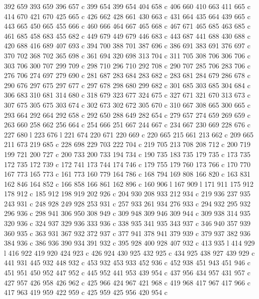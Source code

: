 {{   392 659 393 659 396 657 c
   399 654 399 654 404 658 c
   406 660 410 663 411 665 c
   414 670 421 670 425 665 c
   426 662 428 661 430 663 c
   431 664 435 664 439 665 c
   443 665 450 665 455 666 c
   460 666 464 667 465 668 c
   467 671 465 685 463 685 c
   461 685 458 683 455 682 c
   449 679 449 679 446 683 c
   443 687 441 688 430 688 c
   420 688 416 689 407 693 c
   394 700 388 701 387 696 c
   386 691 383 691 376 697 c
   370 702 368 702 365 698 c
   361 694 320 698 313 704 c
   311 705 308 706 306 706 c
   303 706 300 707 299 709 c
   298 710 296 710 292 708 c
   290 707 285 706 283 706 c
   276 706 274 697 279 690 c
   281 687 283 684 283 682 c
   283 681 284 679 286 678 c
   290 676 297 675 297 677 c
   297 678 298 680 299 682 c
   301 685 303 685 304 684 c
   306 683 310 681 314 680 c
   318 679 323 677 324 675 c
   327 671 321 670 313 673 c
   307 675 305 675 303 674 c
   302 673 302 672 305 670 c
   310 667 308 665 300 665 c
   293 664 292 664 292 658 c
   292 650 288 649 282 654 c
   279 657 274 659 269 659 c
   263 660 258 662 256 664 c
   254 666 251 667 244 667 c
   234 667 230 669 228 676 c
   227 680 l
   223 676 l
   221 674 220 671 220 669 c
   220 665 215 661 213 662 c
   209 665 211 673 219 685 c
   228 698 229 703 222 704 c
   219 705 213 708 208 712 c
   200 719 199 721 200 727 c
   200 733 200 733 194 734 c
   190 735 183 735 179 735 c
   173 735 172 735 172 739 c
   172 741 173 744 174 746 c
   179 755 179 760 173 766 c
   170 770 167 773 165 773 c
   161 773 160 779 164 786 c
   168 794 169 808 166 820 c
   163 831 162 846 164 852 c
   166 858 166 861 162 896 c
   160 906 l
   167 909 l
   171 911 175 912 178 912 c
   185 912 198 919 202 926 c
   204 930 208 933 212 934 c
   219 936 237 935 243 931 c
   248 928 249 928 253 931 c
   257 933 261 934 276 933 c
   294 932 295 932 296 936 c
   298 941 306 950 308 949 c
   309 948 309 946 309 944 c
   309 938 314 935 320 936 c
   324 937 329 936 333 936 c
   338 935 341 935 343 937 c
   346 940 357 939 360 935 c
   363 931 367 932 372 937 c
   377 941 378 941 379 939 c
   379 937 382 936 384 936 c
   386 936 390 934 391 932 c
   395 928 400 928 407 932 c
   413 935 l
   414 929 l
   416 922 419 920 424 923 c
   426 924 430 925 432 925 c
   434 925 438 927 439 929 c
   441 931 445 932 448 932 c
   453 932 453 933 452 936 c
   452 938 451 943 451 946 c
   451 951 450 952 447 952 c
   445 952 441 953 439 954 c
   437 956 434 957 431 957 c
   427 957 426 958 426 962 c
   425 966 424 967 421 968 c
   419 968 417 967 417 966 c
   417 963 419 959 422 959 c
   425 959 425 956 420 954 c
}}

